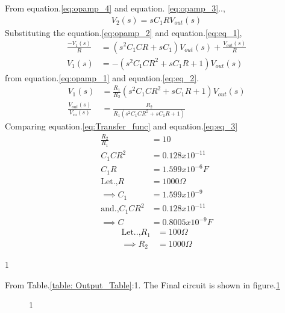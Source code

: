 \begin{enumerate}[label=\thesubsection.\arabic*.,ref=\thesubsection.\theenumi]
From equation.\ref{eq:opamp_4} and equation. \ref{eq:opamp_3}..,
\begin{align}
    V_2(s) = sC_1RV_{out}(s) \label{eq:eq_1}
\end{align}
Substituting the equation.\ref{eq:opamp_2} and equation.\ref{eq:eq_1},
\begin{align}
    \frac{-V_1(s)}{R} &= (s^2C_1CR + sC_1)V_{out}(s) +\frac{V_{out}(s)}{R}\\
    V_1(s) &= -(s^2C_1CR^2+sC_1R+1)V_{out}(s)\label{eq:eq_2}
\end{align}
from equation.\ref{eq:opamp_1} and equation.\ref{eq:eq_2}.
\begin{align}
     V_1(s) &= \frac{R_1}{R_2}(s^2C_1CR^2+sC_1R+1)V_{out}(s)\\
    \frac{V_{out}(s)}{V_{in}(s)} &= \frac{R_2}{R_1(s^2C_1CR^2+sC_1R+1)} \label{eq:eq_3}
\end{align}
Comparing equation.\ref{eq:Transfer_func} and equation.\ref{eq:eq_3}
\begin{align}
    \frac{R_2}{R_1} &= 10 \\
    C_1CR^2 &= 0.128x10^{-11} \\
    C_1R &= 1.599x10^{-6} F\\
\text{Let.,} R &= 1000 \Omega\\
\implies C_1 &= 1.599x10^{-9} \\
 \text{and.,} C_1CR^2 &= 0.128x10^{-11} \\
 \implies C &= 0.8005x10^{-9} F
\end{align}
\begin{align}
\text{Let..,} R_1 &= 100\Omega\\
\implies R_2 &= 1000\Omega
\end{align}
\begin{table}[!ht]
\centering

\caption{1}
\label{table: Output_Table}
\end{table}
From Table.\ref{table: Output_Table}:1. The Final circuit is shown in figure.\ref{fig:Final_circuit}
\begin{figure}[!hbt]
	\begin{center}
			\resizebox{\columnwidth}{!}{}
	\end{center}
\caption{1}
\label{fig:Final_circuit}
\end{figure}
\end{enumerate}



